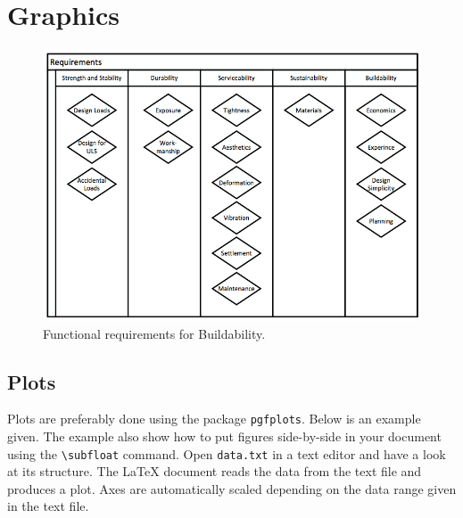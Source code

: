 

\chapter{Graphics}

\begin{figure}[H]
\centering
\includegraphics[scale=0.4]{img/GR-FR.png}
\caption{Functional requirements for Buildability.}
\label{figure:test}
\end{figure}


\section{Plots}
Plots are preferably done using the package \texttt{pgfplots}. Below is an example given. The example also show how to put figures side-by-side in your document using the \texttt{\textbackslash subfloat} command. Open \texttt{data.txt} in a text editor and have a look at its structure. The \LaTeX{} document reads the data from the text file and produces a plot. Axes are automatically scaled depending on the data range given in the text file. 

